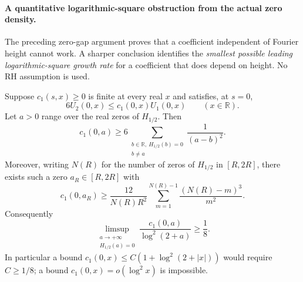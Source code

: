 \paragraph{A quantitative logarithmic-square obstruction from the actual zero density.}
The preceding zero-gap argument proves that a coefficient
independent of Fourier height cannot work. A sharper
conclusion identifies the \emph{smallest possible leading
logarithmic-square growth rate} for a coefficient that
does depend on height. No RH assumption is used.

\begin{theorem}
\label{thm:log-square-necessary}
Suppose $c_1(s,x)\ge0$ is finite at every real
$x$ and satisfies, at $s=0$,
\begin{equation}\label{eq:spatial-n1}
6U_2(0,x)\le c_1(0,x)U_1(0,x)
\qquad(x\in\mathbb R).
\end{equation}
Let $a>0$ range over the real zeros of $H_{1/2}$.
Then
\begin{equation}\label{eq:zeroexactenergy}
\boxed{\quad
c_1(0,a)\ge
6\sum_{\substack{b\in\mathbb R,\ H_{1/2}(b)=0\\b\ne a}}
\frac1{(a-b)^2}.\quad}
\end{equation}
Moreover, writing $N(R)$ for the number of zeros of
$H_{1/2}$ in $[R,2R]$, there exists such a zero
$a_R\in[R,2R]$ with
\begin{equation}\label{eq:finitezeroenergy}
c_1(0,a_R)\ge
\frac{12}{N(R)R^2}
\sum_{m=1}^{N(R)-1}
\frac{(N(R)-m)^3}{m^2}.
\end{equation}
Consequently
\begin{equation}\label{eq:logsquareobstruction}
\boxed{\quad
\limsup_{\substack{a\to+\infty\\H_{1/2}(a)=0}}
\frac{c_1(0,a)}{\log^2(2+a)}
\ge\frac18.\quad}
\end{equation}
In particular a bound
$c_1(0,x)\le C(1+\log^2(2+|x|))$
would require $C\ge1/8$; a bound
$c_1(0,x)=o(\log^2 x)$ is impossible.
\end{theorem}
